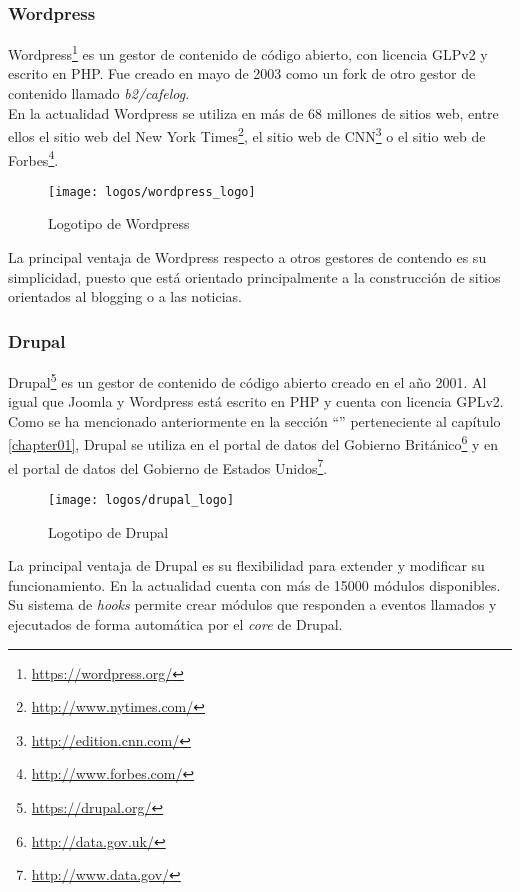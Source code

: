 \subsubsection{Wordpress}
Wordpress\footnote{\url{https://wordpress.org/}} es un gestor de contenido de código abierto, con licencia GLPv2 y escrito en PHP.  Fue creado en mayo de 2003 como un fork de otro gestor de contenido llamado \textit{b2/cafelog}.\\
En la actualidad Wordpress se utiliza en más de 68 millones de sitios web, entre ellos el sitio web del New York Times\footnote{\url{http://www.nytimes.com/}}, el sitio web de CNN\footnote{\url{http://edition.cnn.com/}} o el sitio web de Forbes\footnote{\url{http://www.forbes.com/}}.

\begin{figure}[h]
\centering
\texttt{[image: logos/wordpress\_logo]}
\caption{Logotipo de Wordpress}
\end{figure}

La principal ventaja de Wordpress respecto a otros gestores de contendo es su simplicidad, puesto que está orientado principalmente a la construcción de sitios orientados al blogging o a las noticias.


\subsubsection{Drupal}
Drupal\footnote{\url{https://drupal.org/}} es un gestor de contenido de código abierto creado en el año 2001.  Al igual que Joomla y Wordpress está escrito en PHP y cuenta con licencia GPLv2.\\
Como se ha mencionado anteriormente en la sección ``'' perteneciente al capítulo \ref{chapter01}, Drupal se utiliza en el portal de datos del Gobierno Británico\footnote{\url{http://data.gov.uk/}} y en el portal de datos del Gobierno de Estados Unidos\footnote{\url{http://www.data.gov/}}.

\begin{figure}[h]
\centering
\texttt{[image: logos/drupal\_logo]}
\caption{Logotipo de Drupal}
\end{figure}

La principal ventaja de Drupal es su flexibilidad para extender y modificar su funcionamiento.  En la actualidad cuenta con más de 15000 módulos disponibles.  Su sistema de \textit{hooks} permite crear módulos que responden a eventos llamados y ejecutados de forma automática por el \textit{core} de Drupal.





